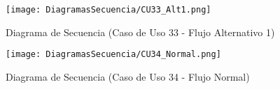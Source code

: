 \begin{landscape}
  \label{fig:Secuencia_CU33_Alt1}
  \vspace*{\fill}
  \begin{figure}[!htbp]
    \centering
    \texttt{[image: DiagramasSecuencia/CU33\_Alt1.png]}
    \caption{Diagrama de Secuencia (Caso de Uso 33 - Flujo Alternativo 1)}
  \end{figure}
  \vfill
\end{landscape}
\FloatBarrier

\begin{landscape}
  \label{fig:Secuencia_CU34_Normal}
  \vspace*{\fill}
  \begin{figure}[!htbp]
    \centering
    \texttt{[image: DiagramasSecuencia/CU34\_Normal.png]}
    \caption{Diagrama de Secuencia (Caso de Uso 34 - Flujo Normal)}
  \end{figure}
  \vfill
\end{landscape}
\FloatBarrier
